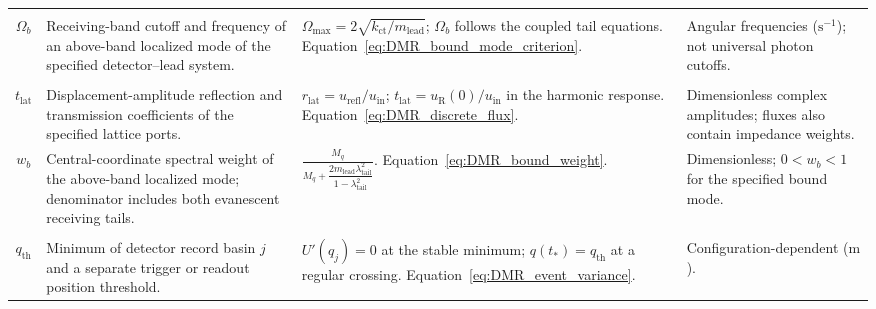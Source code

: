 \begin{longtable}{@{} c p{5.5cm} p{4cm} p{3.5cm} @{}}
\begin{tabular}[c]{@{}c@{}}$\Omega_{\max}$ \\ $\Omega_b$\end{tabular} & {\raggedright Receiving-band cutoff and frequency of an above-band localized mode of the specified detector--lead system.\par} & {\raggedright $\Omega_{\max}=2\sqrt{k_{\mathrm{ct}}/m_{\mathrm{lead}}}$; $\Omega_b$ follows the coupled tail equations. \newline Equation~\eqref{eq:DMR_bound_mode_criterion}.\par} & {\raggedright Angular frequencies ($\mathrm{s^{-1}}$); not universal photon cutoffs.\par} \\

\begin{tabular}[c]{@{}c@{}}$r_{\mathrm{lat}}$ \\ $t_{\mathrm{lat}}$\end{tabular} & {\raggedright Displacement-amplitude reflection and transmission coefficients of the specified lattice ports.\par} & {\raggedright $r_{\mathrm{lat}}=u_{\mathrm{refl}}/u_{\mathrm{in}}$; $t_{\mathrm{lat}}=u_{\mathrm R}(0)/u_{\mathrm{in}}$ in the harmonic response. \newline Equation~\eqref{eq:DMR_discrete_flux}.\par} & {\raggedright Dimensionless complex amplitudes; fluxes also contain impedance weights.\par} \\

$w_b$ & {\raggedright Central-coordinate spectral weight of the above-band localized mode; denominator includes both evanescent receiving tails.\par} & {\raggedright $\displaystyle\frac{M_q}{M_q+\dfrac{2m_{\mathrm{lead}}\lambda_{\mathrm{tail}}^2}{1-\lambda_{\mathrm{tail}}^2}}$. \newline Equation~\eqref{eq:DMR_bound_weight}.\par} & {\raggedright Dimensionless; $0<w_b<1$ for the specified bound mode.\par} \\

\begin{tabular}[c]{@{}c@{}}$q_j$ \\ $q_{\mathrm{th}}$\end{tabular} & {\raggedright Minimum of detector record basin $j$ and a separate trigger or readout position threshold.\par} & {\raggedright $U'(q_j)=0$ at the stable minimum; $q(t_*)=q_{\mathrm{th}}$ at a regular crossing. \newline Equation~\eqref{eq:DMR_event_variance}.\par} & {\raggedright Configuration-dependent ($\mathrm m$).\par} \\


\end{longtable}
